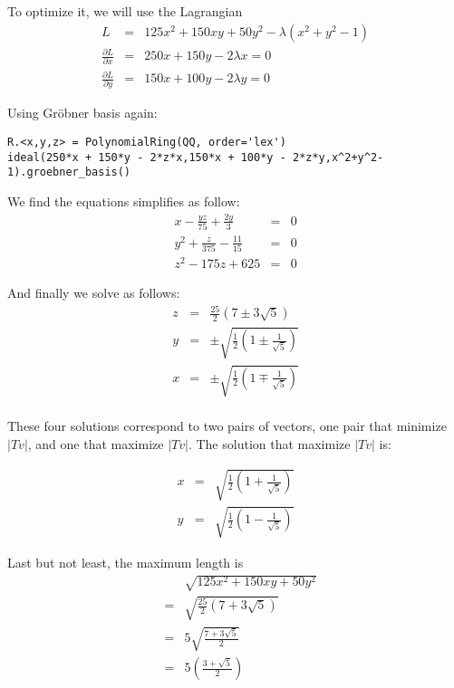 To optimize it, we will use the Lagrangian
\begin{eqnarray*}
  L &=& 125x^2 + 150xy + 50y^2 - \lambda(x^2 + y^2 - 1) \\
  \frac{\partial{L}}{\partial x} &=& 250x + 150y - 2\lambda x = 0 \\
  \frac{\partial{L}}{\partial y} &=& 150x + 100y - 2\lambda y = 0
\end{eqnarray*}

Using Gröbner basis again:
\begin{verbatim}
R.<x,y,z> = PolynomialRing(QQ, order='lex')
ideal(250*x + 150*y - 2*z*x,150*x + 100*y - 2*z*y,x^2+y^2-1).groebner_basis()
\end{verbatim}

We find the equations simplifies as follow:
\begin{eqnarray*}
  x - \frac{yz}{75} + \frac{2y}{3} &=& 0 \\
  y^2 + \frac{z}{375} - \frac{11}{15} &=& 0 \\
  z^2 - 175z + 625 &=& 0 
\end{eqnarray*}

And finally we solve as follows:
\begin{eqnarray*}
  z &=& \frac{25}{2}(7 \pm 3 \sqrt{5}) \\
  y &=& \pm\sqrt{\frac{1}{2}\left(1 \pm \frac{1}{\sqrt{5}}\right)} \\
  x &=& \pm\sqrt{\frac{1}{2}\left(1 \mp \frac{1}{\sqrt{5}}\right)} \\
\end{eqnarray*}

These four solutions correspond to two pairs of vectors, one pair that minimize $ |Tv| $, and one that maximize $ |Tv| $. The solution that maximize $ |Tv| $ is:

\begin{eqnarray*}
  x &=& \sqrt{\frac{1}{2}\left(1 + \frac{1}{\sqrt{5}}\right)} \\
  y &=& \sqrt{\frac{1}{2}\left(1 - \frac{1}{\sqrt{5}}\right)}
\end{eqnarray*}

Last but not least, the maximum length is 
\begin{eqnarray*}
  & & \sqrt{125x^2 + 150xy + 50y^2} \\
  &=& \sqrt{\frac{25}{2} (7 + 3 \sqrt{5})} \\
  &=& 5\sqrt{\frac{7 + 3\sqrt{5}}{2}} \\
  &=& 5\left(\frac{3 + \sqrt{5}}{2}\right)
\end{eqnarray*}